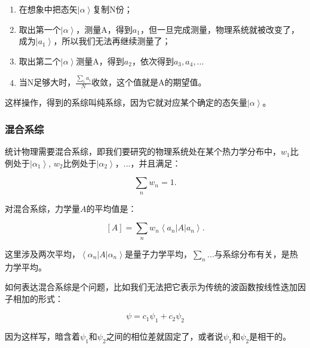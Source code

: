 \begin{enumerate}

\item 在想象中把态矢$\left| \alpha \right\rangle$复制N份；

\item 取出第一个$\left| \alpha \right\rangle$，测量A，得到$a_1$，但一旦完成测量，物理系统就被改变了，成为$\left| a_1 \right\rangle$，所以我们无法再继续测量了；

\item 取出第二个$\left| \alpha \right\rangle$测量A，得到$a_2$，依次得到$a_3, a_4, ...$

\item 当N足够大时，$\frac{\sum\limits_{i} a_i}{N}$收敛，这个值就是A的期望值。

\end{enumerate}

这样操作，得到的系综叫纯系综，因为它就对应某个确定的态矢量$\left| \alpha \right\rangle$。

\subsubsection{混合系综}

统计物理需要混合系综，即我们要研究的物理系统处在某个热力学分布中，$w_1$比例处于$\left| \alpha_1 \right\rangle$, $w_2$比例处于$\left| \alpha_2 \right\rangle$，...，并且满足：

\begin{equation}
\sum_n w_n =1.
\end{equation}

对混合系综，力学量$A$的平均值是：

\begin{equation}\label{statistic average}
[A] = \sum\limits_n w_n \left\langle a_n
\right| A \left| a_n \right\rangle.
\end{equation}

这里涉及两次平均，$\left\langle \alpha_n \right| A \left| \alpha_n \right\rangle$是量子力学平均，$\sum\limits_n ... $与系综分布有关，是热力学平均。

如何表达混合系综是个问题，比如我们无法把它表示为传统的波函数按线性迭加因子相加的形式：

\begin{equation*}
\psi = c_1 \psi_1 + c_2 \psi_2
\end{equation*}

因为这样写，暗含着$\psi_1$和$\psi_2$之间的相位差就固定了，或者说$\psi_1$和$\psi_2$是相干的。

